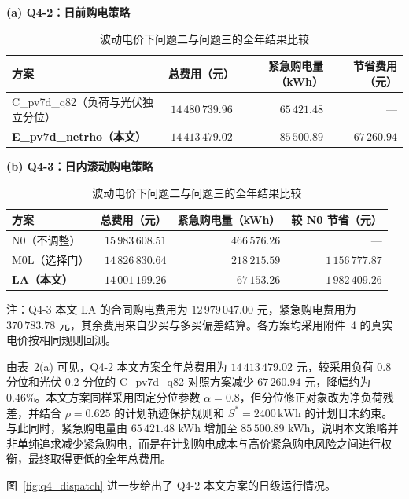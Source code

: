 \begin{table}[!htbp]
  \centering
  \caption{波动电价下问题二与问题三的全年结果比较}
  \label{tab:q4_all}
  \small

  \textbf{(a) Q4-2：日前购电策略}\par\medskip
  \begin{tabular}{lrrr}
    \toprule
    方案 & 总费用（元） & 紧急购电量（kWh） & 节省费用（元） \\
    \midrule
    C\_pv7d\_q82（负荷与光伏独立分位）
      & $14\,480\,739.96$ & $65\,421.48$ & --- \\
    \textbf{E\_pv7d\_netrho（本文）}
      & \textbf{$14\,413\,479.02$} & $85\,500.89$ & \textbf{$67\,260.94$} \\
    \bottomrule
  \end{tabular}

  \medskip

  \textbf{(b) Q4-3：日内滚动购电策略}\par\medskip
  \begin{tabular}{lrrr}
    \toprule
    方案 & 总费用（元） & 紧急购电量（kWh） & 较 N0 节省（元） \\
    \midrule
    N0（不调整）
      & $15\,983\,608.51$ & $466\,576.26$ & --- \\
    M0L（选择门）
      & $14\,826\,830.64$ & $218\,215.59$ & $1\,156\,777.87$ \\
    \textbf{LA（本文）}
      & \textbf{$14\,001\,199.26$} & \textbf{$67\,153.26$} & \textbf{$1\,982\,409.26$} \\
    \bottomrule
  \end{tabular}

  \par\medskip
  {\small 注：Q4-3 本文 LA 的合同购电费用为 $12\,979\,047.00$ 元，紧急购电费用为 $370\,783.78$ 元，其余费用来自少买与多买偏差结算。各方案均采用附件~4 的真实电价按相同规则回测。}
\end{table}

由表~\ref{tab:q4_all}(a) 可见，Q4-2 本文方案全年总费用为 $14\,413\,479.02$ 元，较采用负荷 $0.8$ 分位和光伏 $0.2$ 分位的 C\_pv7d\_q82 对照方案减少 $67\,260.94$ 元，降幅约为 $0.46\%$。本文方案同样采用固定分位参数 $\alpha=0.8$，但分位修正对象改为净负荷残差，并结合 $\rho=0.625$ 的计划轨迹保护规则和 $S^{*}=2400\,\mathrm{kWh}$ 的计划日末约束。与此同时，紧急购电量由 $65\,421.48$ kWh 增加至 $85\,500.89$ kWh，说明本文策略并非单纯追求减少紧急购电，而是在计划购电成本与高价紧急购电风险之间进行权衡，最终取得更低的全年总费用。

图~\ref{fig:q4_dispatch} 进一步给出了 Q4-2 本文方案的日级运行情况。

